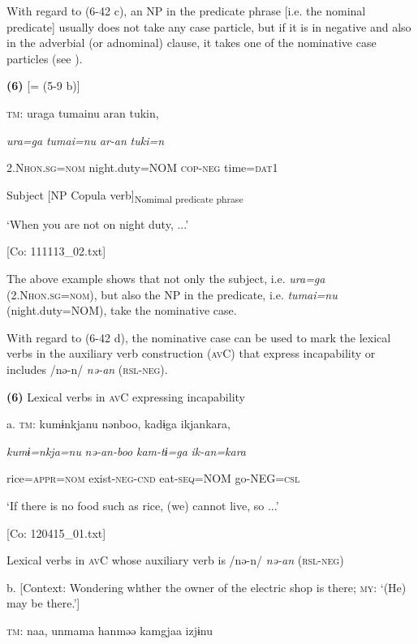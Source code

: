   With regard to (6-42 c), an NP in the predicate phrase [i.e. the nominal predicate] usually does not take any case particle, but if it is in negative and also in the adverbial (or adnominal) clause, it takes one of the nominative case particles (see ).

\textbf{(6)}  [= (5-9 b)]

  \textsc{tm}:  uraga  tumainu  aran  tukin,

    \textit{ura=ga}  \textit{tumai=nu}  \textit{ar-an}  \textit{tuki=n}

    2.N\textsc{hon}.\textsc{sg}=\textsc{nom}  night.duty=NOM  \textsc{cop}-\textsc{neg}  time=\textsc{dat}1

    Subject  [NP  Copula verb]\textsubscript{Nomimal predicate phrase}  

    ‘When you are not on night duty, ...’

    [Co: 111113\_02.txt]

The above example shows that not only the subject, i.e. \textit{ura=ga} (2.N\textsc{hon}.\textsc{sg}=\textsc{nom}), but also the NP in the predicate, i.e. \textit{tumai=nu} (night.duty=NOM), take the nominative case.

  With regard to (6-42 d), the nominative case can be used to mark the lexical verbs in the auxiliary verb construction (\textsc{av}C) that express incapability or includes /nə-n/ \textit{nə-an} (\textsc{rsl}-\textsc{neg}).

\textbf{(6)}  Lexical verbs in \textsc{av}C expressing incapability

  a.  \textsc{tm}:  kumɨnkjanu  nənboo,  kadɨga  ikjankara,

      \textit{kumɨ=nkja=nu}  \textit{nə-an-boo}  \textit{kam-tɨ=ga}  \textit{ik-an=kara}

      rice=\textsc{appr}=\textsc{nom}  exist-\textsc{neg}-\textsc{cnd}  eat-\textsc{seq}=NOM  go-NEG=\textsc{csl}

      ‘If there is no food such as rice, (we) cannot live, so ...’

      [Co: 120415\_01.txt]

  Lexical verbs in \textsc{av}C whose auxiliary verb is /nə-n/ \textit{nə-an} (\textsc{rsl}-\textsc{neg})

  b.  [Context: Wondering whther the owner of the electric shop is there; \textsc{my}: ‘(He) may be there.’]

    \textsc{tm}:  naa,  unmama  hanməə  kamgjaa  izjɨnu

